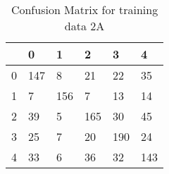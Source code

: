\begin{table}[H]
\centering
\begin{tabular}{|l|l|l|l|l|l|}
\hline
 & 0 & 1 & 2 & 3 & 4 \\
\hline
0 & 147 & 8 & 21 & 22 & 35 \\
\hline
1 & 7 & 156 & 7 & 13 & 14 \\
\hline
2 & 39 & 5 & 165 & 30 & 45 \\
\hline
3 & 25 & 7 & 20 & 190 & 24 \\
\hline
4 & 33 & 6 & 36 & 32 & 143 \\
\hline
\end{tabular}
\caption{Confusion Matrix for training data 2A}
\label{tab:conf_train2a}
\end{table}
